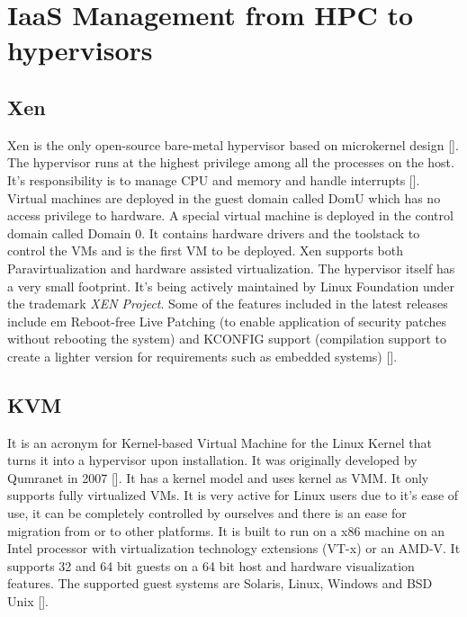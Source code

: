 \section{IaaS Management from HPC to hypervisors}
\label{S:o-hypervisors}

\subsection{Xen}

Xen is the only open-source bare-metal hypervisor based on microkernel
design [\cite{www-xen-wikipedia}]. The hypervisor runs at the highest
privilege among all the processes on the host. It's responsibility is
to manage CPU and memory and handle
interrupts [\cite{www-xen-overview}]. Virtual machines are deployed in
the guest domain called DomU which has no access privilege to
hardware. A special virtual machine is deployed in the control domain
called Domain 0. It contains hardware drivers and the toolstack to
control the VMs and is the first VM to be deployed. Xen supports both
Paravirtualization and hardware assisted virtualization. The
hypervisor itself has a very small footprint. It's being actively
maintained by Linux Foundation under the trademark \textit{XEN
  Project}. Some of the features included in the latest releases
include {em Reboot-free Live Patching} (to enable application of
security patches without rebooting the system) and KCONFIG support
(compilation support to create a lighter version for requirements such
as embedded systems) [\cite{www-xen-fl}].
          
\subsection{KVM}

It is an acronym for Kernel-based Virtual Machine for the Linux Kernel
that turns it into a hypervisor upon installation. It was originally
developed by Qumranet in 2007 [\cite{www-KVM-wiki}]. It has a kernel
model and uses kernel as VMM. It only supports fully virtualized
VMs. It is very active for Linux users due to it's ease of use, it can
be completely controlled by ourselves and there is an ease for
migration from or to other platforms. It is built to run on a x86
machine on an Intel processor with virtualization technology
extensions (VT-x) or an AMD-V. It supports 32 and 64 bit guests on a
64 bit host and hardware visualization features. The supported guest
systems are Solaris, Linux, Windows and BSD
Unix [\cite{www-KVM-webpage}].

